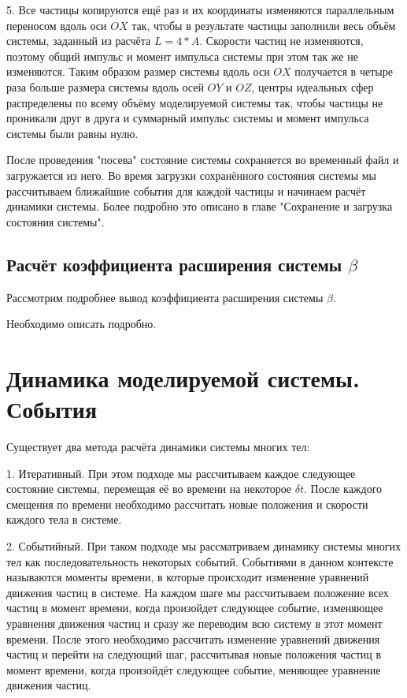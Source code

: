 \documentclass[a4paper]{article}
\begin{document}
5. Все частицы копируются ещё раз и их координаты изменяются параллельным переносом вдоль оси $ OX $ так, чтобы в результате частицы заполнили весь объём системы, заданный из расчёта $ L = 4*A $. Скорости частиц не изменяются, поэтому общий импульс и момент импульса системы при этом так же не изменяются. Таким образом размер системы вдоль оси $ OX $ получается в четыре раза больше размера системы вдоль осей $ OY$ и $ OZ $, центры идеальных сфер распределены по всему объёму моделируемой системы так, чтобы частицы не проникали друг в друга и суммарный импульс системы и момент импульса системы были равны нулю.

После проведения "посева" состояние системы сохраняется во временный файл и загружается из него. Во время загрузки сохранённого состояния системы мы рассчитываем ближайшие события для каждой частицы и начинаем расчёт динамики системы. Более подробно это описано в главе "Сохранение и загрузка состояния системы".

\subsection{Расчёт коэффициента расширения системы $ \beta $ }
Рассмотрим подробнее вывод коэффициента расширения системы $ \beta $.

Необходимо описать подробно.

\newpage
\section{Динамика моделируемой системы. События}

Существует два метода расчёта динамики системы многих тел:

1. Итеративный. При этом подходе мы рассчитываем каждое следующее состояние системы, перемещая её во времени на некоторое $ \delta t $. После каждого смещения по времени необходимо рассчитать новые положения и скорости каждого тела в системе. 

2. Событийный. При таком подходе мы рассматриваем динамику системы многих тел как последовательность некоторых событий. Событиями в данном контексте называются моменты времени, в которые происходит изменение уравнений движения частиц в системе.
На каждом шаге мы рассчитываем положение всех частиц в момент времени, когда произойдет следующее событие, изменяющее уравнения движения частиц и сразу же переводим всю систему в этот момент времени. После этого необходимо рассчитать изменение уравнений движения частиц и перейти на следующий шаг, рассчитывая новые положения частиц в момент времени, когда произойдёт следующее событие, меняющее уравнение движения частиц.
\end{document}
